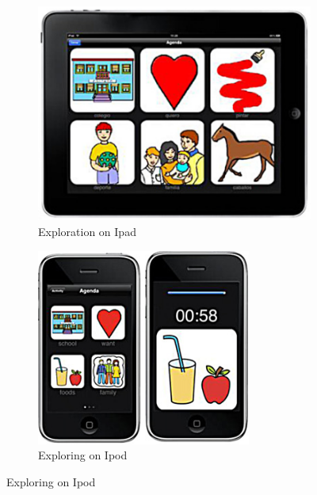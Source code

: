 \begin{figure}[!hbt]\centering
    \begin{subfigure}{0.3\textwidth}
 \includegraphics[width=\textwidth]{poten1}
 \caption{Exploration on Ipad}
    \end{subfigure}\hspace{0.1\textwidth}
    \begin{subfigure}{0.3\textwidth}
\includegraphics[width=\textwidth]{poten2}
  \caption{Exploring on Ipod}
    \end{subfigure}\hspace{0.2\textwidth}

\end{figure}
